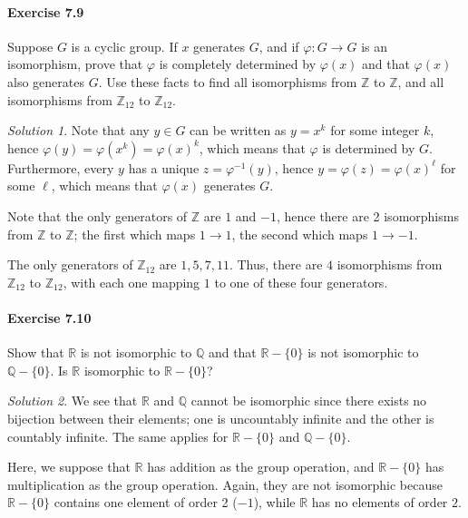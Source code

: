 \documentclass[11pt]{report}
\def\R{\mathbb{R}}
\def\Q{\mathbb{Q}}
\def\Z{\mathbb{Z}}
\theoremstyle{remark}
\newtheorem*{solution}{Solution}
\begin{document}
    \paragraph{Exercise 7.9} Suppose $G$ is a cyclic group. If $x$ generates $G$,
    and if $\varphi\colon G \to G$ is an isomorphism, prove that $\varphi$ is
    completely determined by $\varphi(x)$ and that $\varphi(x)$ also generates $G$.
    Use these facts to find all isomorphisms from $\Z$ to $\Z$, and all isomorphisms
    from $\Z_{12}$ to $\Z_{12}$.
    \begin{solution}
        Note that any $y \in G$ can be written as $y = x^k$ for some integer $k$,
        hence $\varphi(y) = \varphi(x^k) = \varphi(x)^k$, which means that $\varphi$
        is determined by $G$. Furthermore, every $y$ has a unique $z =
        \varphi^{-1}(y)$, hence $y = \varphi(z) = \varphi(x)^\ell$ for some $\ell$,
        which means that $\varphi(x)$ generates $G$.

        Note that the only generators of $\Z$ are $1$ and $-1$, hence there are 2
        isomorphisms from $\Z$ to $\Z$; the first which maps $1 \to 1$, the second
        which maps $1 \to -1$.

        The only generators of $\Z_{12}$ are $1, 5, 7, 11$. Thus, there are $4$
        isomorphisms from $\Z_{12}$ to $\Z_{12}$, with each one mapping $1$ to one
        of these four generators.
    \end{solution}
    
    \paragraph{Exercise 7.10} Show that $\R$ is not isomorphic to $\Q$ and that $\R
    - \{0\}$ is not isomorphic to $\Q - \{0\}$. Is $\R$ isomorphic to $\R - \{0\}$?
    \begin{solution}
        We see that $\R$ and $\Q$ cannot be isomorphic since there exists no
        bijection between their elements; one is uncountably infinite and the other
        is countably infinite. The same applies for $\R - \{0\}$ and $\Q - \{0\}$.

        Here, we suppose that $\R$ has addition as the group operation, and $\R -
        \{0\}$ has multiplication as the group operation. Again, they are not
        isomorphic because $\R - \{0\}$ contains one element of order 2 ($-1$),
        while $\R$ has no elements of order $2$.
    \end{solution}
    
\end{document}
